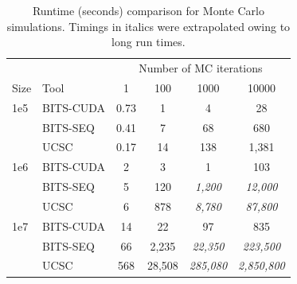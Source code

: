 \documentclass{bioinfo}
\begin{document}
\begin{center}
	\begin{table}[h!b!p!]
	\caption{Runtime (seconds) comparison for Monte Carlo simulations. 
	Timings in italics were extrapolated owing to long run times.}
	\begin{tabular}{l l c c c c}
	\multicolumn{2}{c}{} & \multicolumn{4}{c}{Number of MC iterations} \\
	\cline{3-6}
	Size & Tool & 1 & 100 & 1000 & 10000 \\
	\hline
	1e5 & BITS-CUDA & 0.73 & 1  & 4   & 28 \\
		& BITS-SEQ  & 0.41 & 7  & 68  & 680 \\
		& UCSC      & 0.17 & 14 & 138 & 1,381 \\
	1e6 & BITS-CUDA & 2 & 3    & 1       & 103 \\
		& BITS-SEQ  & 5 & 120  & \emph{1,200} & \emph{12,000} \\
		& UCSC      & 6 & 878  & \emph{8,780} & \emph{87,800} \\
	1e7 & BITS-CUDA & 14  & 22    & 97            & 835 \\
		& BITS-SEQ  & 66  & 2,235  & \emph{22,350}  & \emph{223,500} \\
		& UCSC      & 568 & 28,508 & \emph{285,080} & \emph{2,850,800} \\
	
	\hline
	\end{tabular}
	\label{table:avge}
	\end{table}
\end{center}
		

\end{document}
